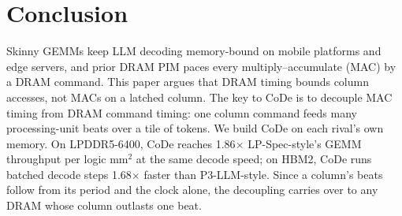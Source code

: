 \section{Conclusion}
\label{sec:conclusion}

Skinny GEMMs keep LLM decoding memory-bound on mobile platforms and edge servers, and prior DRAM PIM paces every
multiply--accumulate (MAC) by a DRAM command. This paper argues that DRAM timing bounds column accesses, not MACs on a
latched column. The key to CoDe is to decouple MAC timing from DRAM command timing: one column command feeds many processing-unit beats over a tile
of tokens. We build CoDe on each rival's own memory. On LPDDR5-6400, CoDe reaches 1.86$\times$ LP-Spec-style's GEMM throughput
per logic mm$^2$ at the same decode speed; on HBM2, CoDe runs batched decode steps 1.68$\times$ faster than P3-LLM-style. Since a
column's beats follow from its period and the clock alone, the decoupling carries over to any DRAM whose column
outlasts one beat.
